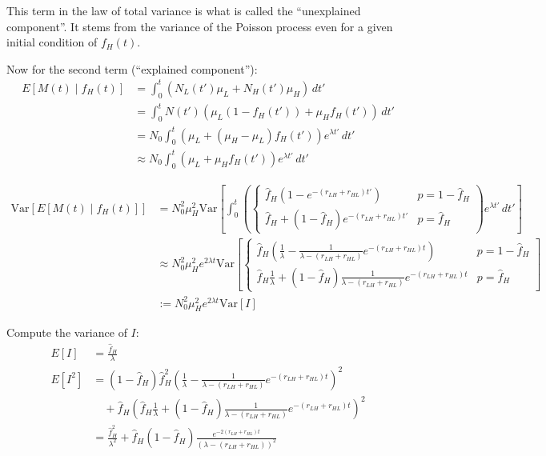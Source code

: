 This term in the law of total variance is what is called the “unexplained component”. It stems from the variance of the Poisson process even for a given initial condition of $f_{H}(t)$.

Now for the second term (“explained component”):
\begin{align*}
E[M(t) \mid f_{H}(t)] &= \int_{0}^{t} \left(N_{L}(t') \mu_{L} + N_{H}(t') \mu_{H}\right) \, dt' \\
&= \int_{0}^{t} N(t') \left(\mu_{L} (1 - f_{H}(t')) + \mu_{H} f_{H}(t')\right) \, dt' \\
&= N_{0} \int_{0}^{t} \left(\mu_{L} + (\mu_{H} - \mu_{L}) f_{H}(t')\right) e^{\lambda t'} \, dt' \\
&\approx N_{0} \int_{0}^{t} \left(\mu_{L} + \mu_{H} f_{H}(t')\right) e^{\lambda t'} \, dt'
\end{align*}

\begin{align*}
\text{Var}\left[E[M(t) \mid f_{H}(t)]\right] &= N_{0}^{2} \mu_{H}^{2} \text{Var}\left[\int_{0}^{t} \left(\begin{cases}
\hat{f}_{H} \left(1 - e^{-(r_{LH} + r_{HL})t'}\right) & p = 1 - \hat{f}_{H} \\
\hat{f}_{H} + \left(1 - \hat{f}_{H}\right) e^{-(r_{LH} + r_{HL})t'} & p = \hat{f}_{H}
\end{cases}\right) e^{\lambda t'} \, dt' \right] \\
&\approx N_{0}^{2} \mu_{H}^{2} e^{2 \lambda t} \text{Var}\left[\begin{cases}
\hat{f}_{H} \left(\frac{1}{\lambda} - \frac{1}{\lambda - (r_{LH} + r_{HL})} e^{-(r_{LH} + r_{HL}) t}\right) & p = 1 - \hat{f}_{H} \\
\hat{f}_{H} \frac{1}{\lambda} + \left(1 - \hat{f}_{H}\right) \frac{1}{\lambda - (r_{LH} + r_{HL})} e^{-(r_{LH} + r_{HL}) t} & p = \hat{f}_{H}
\end{cases}\right] \\
&:= N_{0}^{2} \mu_{H}^{2} e^{2 \lambda t} \text{Var}\left[I\right]
\end{align*}

Compute the variance of $I$:
\begin{align*}
E[I] &= \frac{\hat{f}_{H}}{\lambda} \\
E[I^{2}] &= \left(1 - \hat{f}_{H}\right) \hat{f}_{H}^{2} \left(\frac{1}{\lambda} - \frac{1}{\lambda - (r_{LH} + r_{HL})} e^{-(r_{LH} + r_{HL}) t}\right)^{2} \\
&\quad + \hat{f}_{H} \left(\hat{f}_{H} \frac{1}{\lambda} + \left(1 - \hat{f}_{H}\right) \frac{1}{\lambda - (r_{LH} + r_{HL})} e^{-(r_{LH} + r_{HL}) t}\right)^{2} \\
&= \frac{\hat{f}_{H}^{2}}{\lambda^{2}} + \hat{f}_{H} \left(1 - \hat{f}_{H}\right) \frac{e^{-2(r_{LH} + r_{HL})t}}{\left(\lambda - (r_{LH} + r_{HL})\right)^{2}}
\end{align*}

